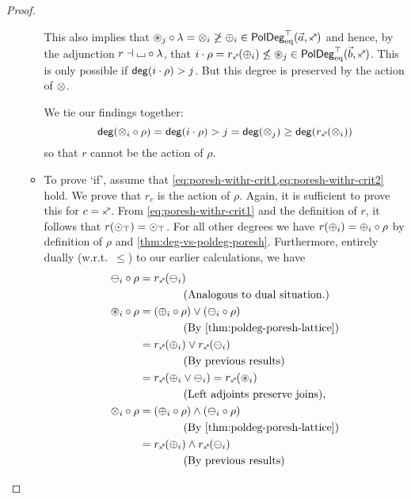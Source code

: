 \documentclass[a4paper]{memoir}
\begin{document}
\begin{proof}
\begin{enumerate}
\begin{itemize}
			This also implies that $\isopol_j \circ \lambda = \mixpol_i \not \geq \pospol_i \in \poldegeqtop(\vec a, \ypolar)$ and hence, by the adjunction $r \dashv {\llcorner\hspace{-.4ex}\lrcorner} \circ \lambda$, that $i \cdot \rho = r_\ypolar(\pospol_i) \not\leq \isopol_j \in \poldegeqtop(\vec b, \ypolar)$.
			This is only possible if $\mathsf{deg}(i \cdot \rho) > j$.
			But this degree is preserved by the action of ${\otimes}$.
			
			We tie our findings together:
			\[
				\getdeg(\mixpol_i \circ \rho) = \getdeg(i \cdot \rho) > j = \getdeg(\mixpol_j) \geq \getdeg(r_\ypolar(\mixpol_i))
			\]
			so that $r$ cannot be the action of $\rho$.
			
			\item To prove `if', assume that \cref{eq:poresh-withr-crit1,eq:poresh-withr-crit2} hold.
			We prove that $r_c$ is the action of $\rho$.
			Again, it is sufficient to prove this for $c = \ypolar$.
			From \cref{eq:poresh-withr-crit1} and the definition of $r$, it follows that $r({\odot}_\top) = {\odot}_\top$.
			For all other degrees we have $r({\oplus}_i) = {\oplus}_i \circ \rho$ by definition of $\rho$ and \cref{thm:deg-vs-poldeg-poresh}.
			Furthermore, entirely dually (w.r.t.\ $\leq$) to our earlier calculations, we have
			\begin{align*}
				\negpol_i \circ \rho &= r_\ypolar(\negpol_i) \\
				&\qquad \qquad \text{(Analogous to dual situation.)} \\
				\isopol_i \circ \rho
				&= (\pospol_i \circ \rho) \vee (\negpol_i \circ \rho) \\
				&\qquad \qquad \text{(By \cref{thm:poldeg-poresh-lattice})} \\
				&= r_\ypolar(\pospol_i) \vee r_\ypolar(\negpol_i) \\
				&\qquad \qquad \text{(By previous results)} \\
				&= r_\ypolar(\pospol_i \vee \negpol_i) = r_\ypolar(\isopol_i) \\
				&\qquad \qquad \text{(Left adjoints preserve joins),} \\
				\mixpol_i \circ \rho
				&= (\pospol_i \circ \rho) \wedge (\negpol_i \circ \rho) \\
				&\qquad \qquad \text{(By \cref{thm:poldeg-poresh-lattice})} \\
				&= r_\ypolar(\pospol_i) \wedge r_\ypolar(\negpol_i) \\
				&\qquad \qquad \text{(By previous results)} \\

\end{align*}
\end{itemize}
\end{enumerate}
\end{proof}
\end{document}
